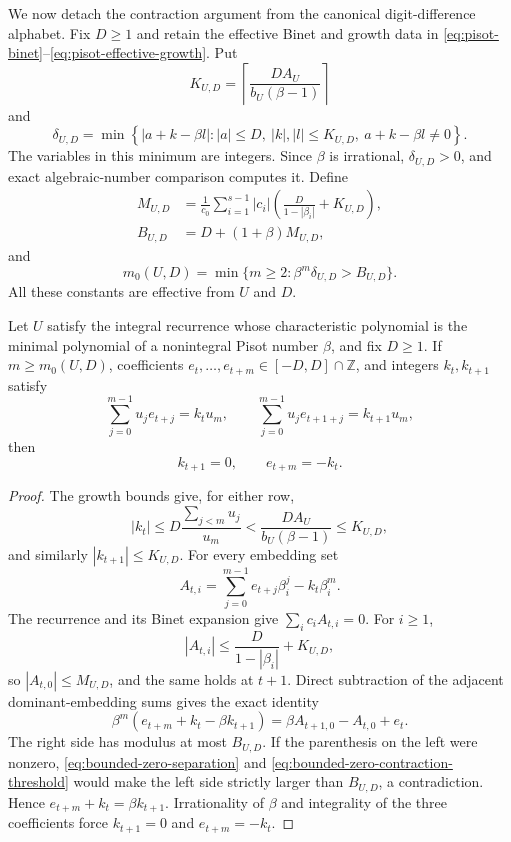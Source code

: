 We now detach the contraction argument from the canonical digit-difference
alphabet.  Fix $D\ge1$ and retain the effective Binet and growth data in
\eqref{eq:pisot-binet}--\eqref{eq:pisot-effective-growth}.  Put
\begin{equation}
K_{U,D}=\left\lceil\frac{DA_U}{b_U(\beta-1)}\right\rceil
\label{eq:bounded-zero-carry-bound}
\end{equation}
and
\begin{equation}
\delta_{U,D}=\min\left\{|a+k-\beta l|:
 |a|\le D,\ |k|,|l|\le K_{U,D},\ a+k-\beta l\ne0\right\}.
\label{eq:bounded-zero-separation}
\end{equation}
The variables in this minimum are integers.  Since $\beta$ is irrational,
$\delta_{U,D}>0$, and exact algebraic-number comparison computes it.  Define
\begin{align}
M_{U,D}&=\frac1{c_0}\sum_{i=1}^{s-1}|c_i|
 \left(\frac{D}{1-|\beta_i|}+K_{U,D}\right),\nonumber\\
B_{U,D}&=D+(1+\beta)M_{U,D},
\label{eq:bounded-zero-conjugate-bound}
\end{align}
and
\begin{equation}
m_0(U,D)=\min\{m\ge2:\beta^m\delta_{U,D}>B_{U,D}\}.
\label{eq:bounded-zero-contraction-threshold}
\end{equation}
All these constants are effective from $U$ and $D$.

\begin{lemma}
\label{lem:bounded-zero-arbitrary-alphabet-collapse}
Let $U$ satisfy the integral recurrence whose characteristic polynomial is
the minimal polynomial of a nonintegral Pisot number $\beta$, and fix
$D\ge1$.  If $m\ge m_0(U,D)$, coefficients
$e_t,\ldots,e_{t+m}\in[-D,D]\cap\mathbb Z$, and integers $k_t,k_{t+1}$
satisfy
\[
\sum_{j=0}^{m-1}u_je_{t+j}=k_tu_m,
\qquad
\sum_{j=0}^{m-1}u_je_{t+1+j}=k_{t+1}u_m,
\]
then
\[
k_{t+1}=0,\qquad e_{t+m}=-k_t.
\]
\end{lemma}

\begin{proof}
The growth bounds give, for either row,
\[
|k_t|\le D\frac{\sum_{j<m}u_j}{u_m}
 <\frac{DA_U}{b_U(\beta-1)}\le K_{U,D},
\]
and similarly $|k_{t+1}|\le K_{U,D}$.  For every embedding set
\[
A_{t,i}=\sum_{j=0}^{m-1}e_{t+j}\beta_i^j-k_t\beta_i^m.
\]
The recurrence and its Binet expansion give $\sum_i c_iA_{t,i}=0$.
For $i\ge1$,
\[
|A_{t,i}|\le\frac{D}{1-|\beta_i|}+K_{U,D},
\]
so $|A_{t,0}|\le M_{U,D}$, and the same holds at $t+1$.
Direct subtraction of the adjacent dominant-embedding sums gives the exact
identity
\begin{equation}
\beta^m(e_{t+m}+k_t-\beta k_{t+1})
=\beta A_{t+1,0}-A_{t,0}+e_t.
\label{eq:bounded-zero-adjacent-identity}
\end{equation}
The right side has modulus at most $B_{U,D}$.  If the parenthesis on the
left were nonzero, \eqref{eq:bounded-zero-separation} and
\eqref{eq:bounded-zero-contraction-threshold} would make the left side
strictly larger than $B_{U,D}$, a contradiction.  Hence
$e_{t+m}+k_t=\beta k_{t+1}$.  Irrationality of $\beta$ and integrality of
the three coefficients force $k_{t+1}=0$ and $e_{t+m}=-k_t$.
\end{proof}

